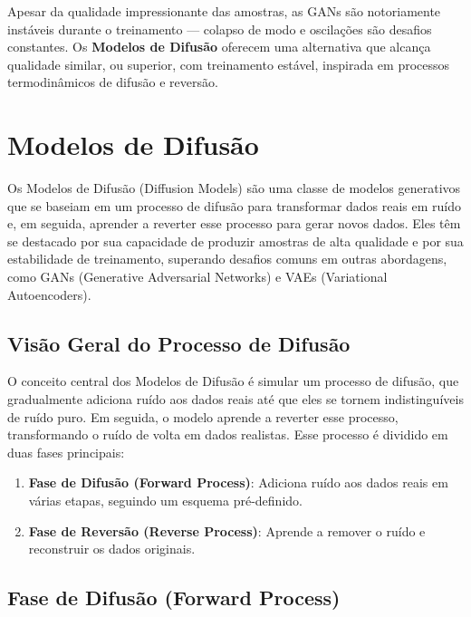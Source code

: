 \documentclass{tufte-handout}
\begin{document}
\medskip
\noindent Apesar da qualidade impressionante das amostras, as GANs são notoriamente instáveis durante o treinamento --- colapso de modo e oscilações são desafios constantes. Os \textbf{Modelos de Difusão} oferecem uma alternativa que alcança qualidade similar, ou superior, com treinamento estável, inspirada em processos termodinâmicos de difusão e reversão.

\section{Modelos de Difusão}

Os Modelos de Difusão (Diffusion Models) são uma classe de modelos generativos que se baseiam em um processo de difusão para transformar dados reais em ruído e, em seguida, aprender a reverter esse processo para gerar novos dados. Eles têm se destacado por sua capacidade de produzir amostras de alta qualidade e por sua estabilidade de treinamento, superando desafios comuns em outras abordagens, como GANs (Generative Adversarial Networks) e VAEs (Variational Autoencoders).

\subsection{Visão Geral do Processo de Difusão}

O conceito central dos Modelos de Difusão é simular um processo de difusão, que gradualmente adiciona ruído aos dados reais até que eles se tornem indistinguíveis de ruído puro. Em seguida, o modelo aprende a reverter esse processo, transformando o ruído de volta em dados realistas. Esse processo é dividido em duas fases principais:
\begin{enumerate}
    \item \textbf{Fase de Difusão (Forward Process)}: Adiciona ruído aos dados reais em várias etapas, seguindo um esquema pré-definido.
    \item \textbf{Fase de Reversão (Reverse Process)}: Aprende a remover o ruído e reconstruir os dados originais.
\end{enumerate}

\subsection{Fase de Difusão (Forward Process)}
\end{document}
